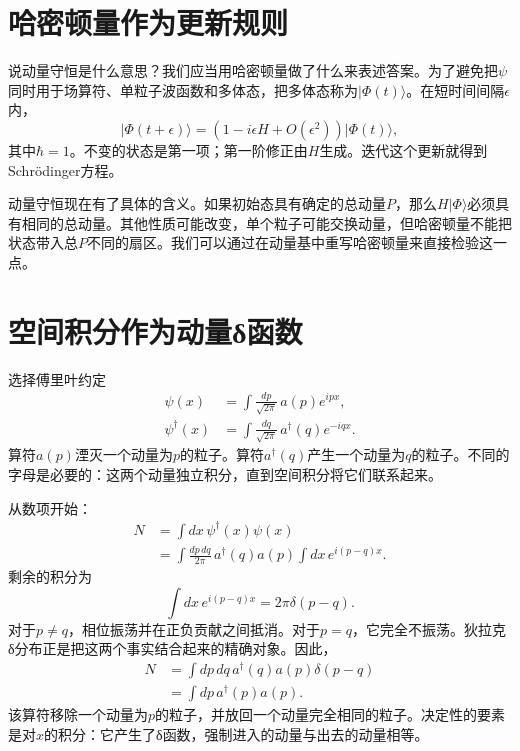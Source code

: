 \section{哈密顿量作为更新规则}

说动量守恒是什么意思？我们应当用哈密顿量做了什么来表述答案。为了避免把\(\psi\)同时用于场算符、单粒子波函数和多体态，把多体态称为\(\lvert\Phi(t)\rangle\)。在短时间间隔\(\epsilon\)内，
\begin{equation}
\lvert\Phi(t+\epsilon)\rangle
=\left(1-i\epsilon H+O(\epsilon^2)\right)
\lvert\Phi(t)\rangle,
\label{eq:l9-short-update}
\end{equation}
其中\(\hbar=1\)。不变的状态是第一项；第一阶修正由\(H\)生成。迭代这个更新就得到Schr\"odinger方程。

动量守恒现在有了具体的含义。如果初始态具有确定的总动量\(P\)，那么\(H\lvert\Phi\rangle\)必须具有相同的总动量。其他性质可能改变，单个粒子可能交换动量，但哈密顿量不能把状态带入总\(P\)不同的扇区。我们可以通过在动量基中重写哈密顿量来直接检验这一点。

\section{空间积分作为动量{\proseunicodefont δ}函数}

选择傅里叶约定
\begin{align}
\psi(x)&=\int\frac{dp}{\sqrt{2\pi}}\,a(p)e^{ipx},\\
\psi^\dagger(x)&=\int\frac{dq}{\sqrt{2\pi}}\,a^\dagger(q)e^{-iqx}.
\label{eq:l9-field-fourier}
\end{align}
算符\(a(p)\)湮灭一个动量为\(p\)的粒子。算符\(a^\dagger(q)\)产生一个动量为\(q\)的粒子。不同的字母是必要的：这两个动量独立积分，直到空间积分将它们联系起来。

从数项开始：
\begin{align}
N
&=\int dx\,\psi^\dagger(x)\psi(x)\\
&=\int\frac{dp\,dq}{2\pi}\,
a^\dagger(q)a(p)
\int dx\,e^{i(p-q)x}.
\end{align}
剩余的积分为
\begin{equation}
\int dx\,e^{i(p-q)x}=2\pi\delta(p-q).
\end{equation}
对于\(p\ne q\)，相位振荡并在正负贡献之间抵消。对于\(p=q\)，它完全不振荡。狄拉克{\proseunicodefont δ}分布正是把这两个事实结合起来的精确对象。因此，
\begin{align}
N
&=\int dp\,dq\,a^\dagger(q)a(p)\delta(p-q)\\
&=\int dp\,a^\dagger(p)a(p).
\label{eq:l9-number-momentum}
\end{align}
该算符移除一个动量为\(p\)的粒子，并放回一个动量完全相同的粒子。决定性的要素是对\(x\)的积分：它产生了{\proseunicodefont δ}函数，强制进入的动量与出去的动量相等。

